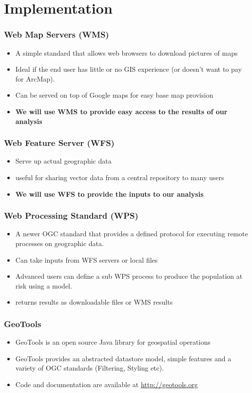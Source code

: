 \documentclass{beamer}
\begin{document}
\section{Implementation}
\begin{frame}[t]
\frametitle{Web Map Servers (WMS)}
\begin{itemize}
\item A simple standard that allows web browsers to download pictures of maps
\item Ideal if the end user has little or no GIS experience (or doesn’t want to pay for ArcMap). 
\item Can be served on top of Google maps for easy base map provision
\item \textbf{We will use WMS to provide easy access to the results of our analysis}
\end{itemize}
\end{frame}
\begin{frame}[t]
\frametitle{Web Feature Server (WFS)}
\begin{itemize}
\item Serve up actual geographic data 
\item useful for sharing vector data from a central repository to many users
\item \textbf{We will use WFS to provide the inputs to our analysis}
\end{itemize}
\end{frame}
\begin{frame}[t]
\frametitle{Web Processing Standard (WPS)}
\begin{itemize}

\item A newer OGC standard \citep{OGC2007} that provides a defined protocol for executing remote processes on geographic data.
\item Can take inputs from WFS servers or local files
\item Advanced users can define a sub WPS process to produce the population at risk using a model.
\item returns results as downloadable files or WMS results
\end{itemize}
\end{frame}


\begin{frame}[t]
\frametitle{GeoTools}
\begin{itemize}
\item GeoTools is an open source Java library for geospatial operations \citep{Hall2008}
\item GeoTools provides an abstracted datastore model, simple features and a variety of OGC standards (Filtering, Styling etc).
\item Code and documentation are available at \url{http://geotools.org}
\end{itemize}
\end{frame}
\end{document}
